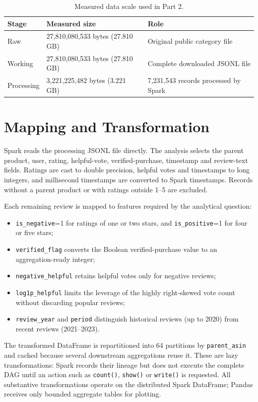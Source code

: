 \documentclass[10pt,a4paper]{article}
\begin{document}
\begin{table}[H]
\centering\small
\caption{Measured data scale used in Part 2.}
\begin{tabularx}{\textwidth}{@{}lYY@{}}\toprule
Stage & Measured size & Role \\\midrule
Raw & 27,810,080,533 bytes (27.810 GB) & Original public category file \\
Working & 27,810,080,533 bytes (27.810 GB) & Complete downloaded JSONL file \\
Processing & 3,221,225,482 bytes (3.221 GB) & 7,231,543 records processed by Spark \\\bottomrule
\end{tabularx}
\end{table}

\newpage
\section{Mapping and Transformation}

Spark reads the processing JSONL file directly. The analysis selects the parent product, user, rating, helpful-vote, verified-purchase, timestamp and review-text fields. Ratings are cast to double precision, helpful votes and timestamps to long integers, and millisecond timestamps are converted to Spark timestamps. Records without a parent product or with ratings outside 1--5 are excluded.

Each remaining review is mapped to features required by the analytical question:
\begin{itemize}
\item \texttt{is\_negative}=1 for ratings of one or two stars, and \texttt{is\_positive}=1 for four or five stars;
\item \texttt{verified\_flag} converts the Boolean verified-purchase value to an aggregation-ready integer;
\item \texttt{negative\_helpful} retains helpful votes only for negative reviews;
\item \texttt{log1p\_helpful} limits the leverage of the highly right-skewed vote count without discarding popular reviews;
\item \texttt{review\_year} and \texttt{period} distinguish historical reviews (up to 2020) from recent reviews (2021--2023).
\end{itemize}

The transformed DataFrame is repartitioned into 64 partitions by \texttt{parent\_asin} and cached because several downstream aggregations reuse it. These are lazy transformations: Spark records their lineage but does not execute the complete DAG until an action such as \texttt{count()}, \texttt{show()} or \texttt{write()} is requested. All substantive transformations operate on the distributed Spark DataFrame; Pandas receives only bounded aggregate tables for plotting.
\end{document}
